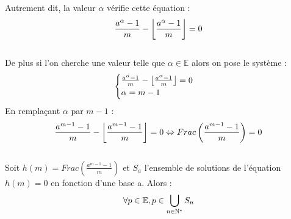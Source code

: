 \documentclass{article}
\begin{document}
Autrement dit, la valeur $\alpha$ vérifie cette équation :
\begin{equation}
\frac{a^{\alpha}-1}{m}-\left \lfloor\frac{a^{\alpha}-1}{m}\right\rfloor=0\notag
\end{equation}\\
De plus si l'on cherche une valeur telle que $\alpha\in\mathbb{E}$ alors on pose le système :
\begin{equation}
    \begin{cases}
      \frac{a^{\alpha}-1}{m}-\left \lfloor\frac{a^{\alpha}-1}{m}\right\rfloor=0\\
      \alpha = m - 1
    \end{cases}\notag
\end{equation}
En remplaçant $\alpha$ par $m-1$ :
\begin{equation}
\frac{a^{m-1}-1}{m}-\left \lfloor\frac{a^{m-1}-1}{m}\right\rfloor=0\notag
\Leftrightarrow Frac\left(\frac{a^{m-1}-1}{m}\right)=0
\end{equation}\\
Soit $h(m) = Frac\left(\frac{a^{m-1}-1}{m}\right)$ et $S_a$ l'ensemble de solutions de l'équation $h(m)=0$ en fonction d'une base a. Alors : \\
\begin{equation}
\forall p \in \mathbb{E}, p \in \bigcup_{n\in\mathbb{N}^{*}}S_n\notag
\end{equation}\\
\end{document}
